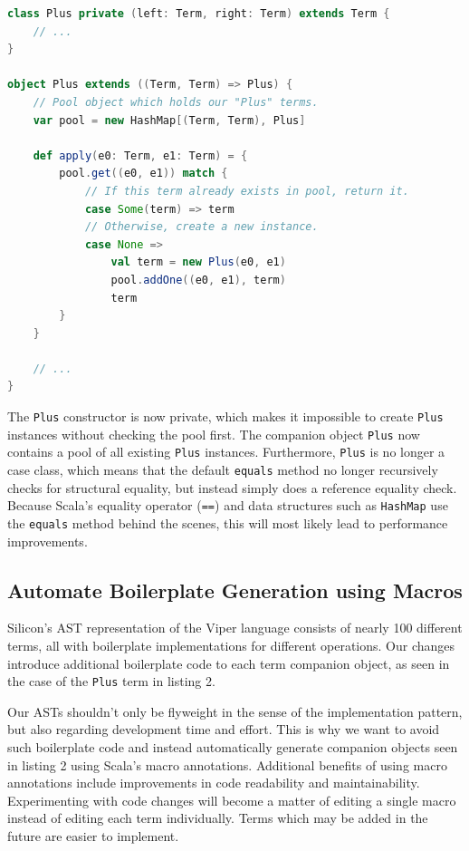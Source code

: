 \documentclass[11pt]{article}
\begin{document}
    \begin{lstlisting}[language=Scala, caption=Avoid instantiating multiple structurally equal terms using the flyweight pattern.]
class Plus private (left: Term, right: Term) extends Term {
    // ...
}

object Plus extends ((Term, Term) => Plus) {
    // Pool object which holds our "Plus" terms.
    var pool = new HashMap[(Term, Term), Plus]

    def apply(e0: Term, e1: Term) = {
        pool.get((e0, e1)) match {
            // If this term already exists in pool, return it. 
            case Some(term) => term
            // Otherwise, create a new instance.
            case None =>
                val term = new Plus(e0, e1)
                pool.addOne((e0, e1), term)
                term
        }
    }

    // ...
}
    \end{lstlisting}

    The \texttt{Plus} constructor is now private, which makes it impossible to
    create \texttt{Plus} instances without checking the pool first. The companion
    object \texttt{Plus} now contains a pool of all existing \texttt{Plus} instances. Furthermore,
    \texttt{Plus} is no longer a case class, which means that the default \texttt{equals}
    method no longer recursively checks for structural equality, but instead
    simply does a reference equality check. Because Scala's equality operator (\texttt{==})
    and data structures such as \texttt{HashMap} use the \texttt{equals} method behind
    the scenes, this will most likely lead to performance improvements.

    \subsection{Automate Boilerplate Generation using Macros} \label{approach:macros}

    Silicon's AST representation of the Viper language consists of nearly 100 different terms,
    all with boilerplate implementations for different operations.
    Our changes introduce additional boilerplate code to each term companion object, as seen in the case
    of the \texttt{Plus} term in listing 2.

    Our ASTs shouldn't only be flyweight in the sense of the implementation pattern, but also
    regarding development time and effort. This is why we want to avoid such boilerplate
    code and instead automatically generate companion objects seen in listing 2 using Scala's macro annotations.
    Additional benefits of using macro annotations include improvements in code
    readability and maintainability. Experimenting with code changes will become a matter
    of editing a single macro instead of editing each term individually.
    Terms which may be added in the future are easier to implement.
\end{document}
